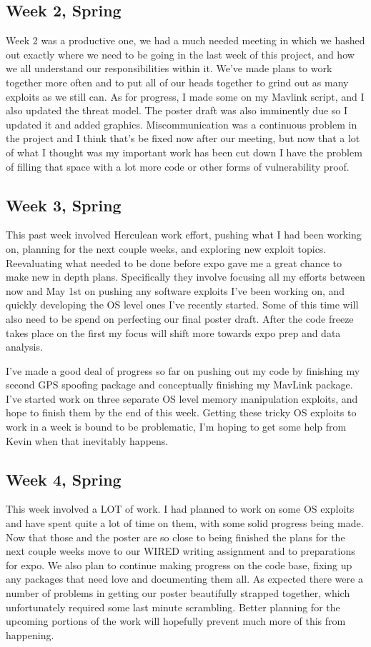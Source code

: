 \documentclass[IEEEtran,letterpaper,10pt,notitlepage,draftclsnofoot,onecolumn]{article}
\begin{document}
\subsection{Week 2, Spring}
Week 2 was a productive one, we had a much needed meeting in which we hashed out exactly where we need to be going in the last week of this project, and how we all understand our responsibilities within it. We've made plans to work together more often and to put all of our heads together to grind out as many exploits as we still can. As for progress, I made some on my Mavlink script, and I also updated the threat model. The poster draft was also imminently due so I updated it and added graphics. Miscommunication was a continuous problem in the project and I think that's be fixed now after our meeting, but now that a lot of what I thought was my important work has been cut down I have the problem of filling that space with a lot more code or other forms of vulnerability proof.
\subsection{Week 3, Spring}
This past week involved Herculean work effort, pushing what I had been working on, planning for the next couple weeks, and exploring new exploit topics. Reevaluating what needed to be done before expo gave me a great chance to make new in depth plans. Specifically they involve focusing all my efforts between now and May 1st on pushing any software exploits I've been working on, and quickly developing the OS level ones I've recently started. Some of this time will also need to be spend on perfecting our final poster draft. After the code freeze takes place on the first my focus will shift more towards expo prep and data analysis.

I've made a good deal of progress so far on pushing out my code by finishing my second GPS spoofing package and conceptually finishing my MavLink package. I've started work on three separate OS level memory manipulation exploits, and hope to finish them by the end of this week. Getting these tricky OS exploits to work in a week is bound to be problematic, I'm hoping to get some help from Kevin when that inevitably happens.
\subsection{Week 4, Spring}
This week involved a LOT of work. I had planned to work on some OS exploits and have spent quite a lot of time on them, with some solid progress being made. Now that those and the poster are so close to being finished the plans for the next couple weeks move to our WIRED writing assignment and to preparations for expo. We also plan to continue making progress on the code base, fixing up any packages that need love and documenting them all. As expected there were a number of problems in getting our poster beautifully strapped together, which unfortunately required some last minute scrambling. Better planning for the upcoming portions of the work will hopefully prevent much more of this from happening.
\end{document}
